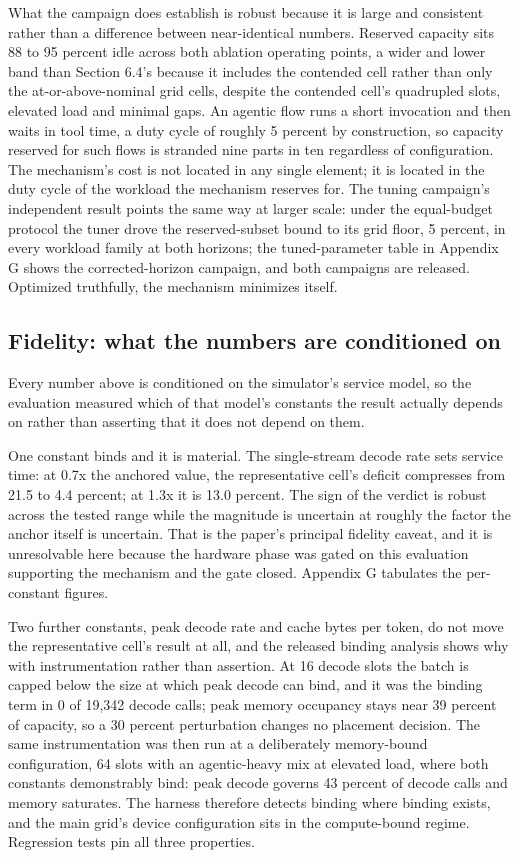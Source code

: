 What the campaign does establish is robust because it is large and
consistent rather than a difference between near-identical numbers.
Reserved capacity sits 88 to 95 percent idle across both ablation
operating points, a wider and lower band than Section 6.4's because it
includes the contended cell rather than only the at-or-above-nominal
grid cells, despite the contended cell's quadrupled slots, elevated load
and minimal gaps. An agentic flow runs a short invocation and then waits
in tool time, a duty cycle of roughly 5 percent by construction, so
capacity reserved for such flows is stranded nine parts in ten
regardless of configuration. The mechanism's cost is not located in any
single element; it is located in the duty cycle of the workload the
mechanism reserves for. The tuning campaign's independent result points
the same way at larger scale: under the equal-budget protocol the tuner
drove the reserved-subset bound to its grid floor, 5 percent, in every
workload family at both horizons; the tuned-parameter table in Appendix
G shows the corrected-horizon campaign, and both campaigns are released.
Optimized truthfully, the mechanism minimizes itself.

\subsection{Fidelity: what the numbers are conditioned on}

Every number above is conditioned on the simulator's service model, so
the evaluation measured which of that model's constants the result
actually depends on rather than asserting that it does not depend on
them.

One constant binds and it is material. The single-stream decode rate
sets service time: at 0.7x the anchored value, the representative cell's
deficit compresses from 21.5 to 4.4 percent; at 1.3x it is 13.0 percent.
The sign of the verdict is robust across the tested range while the
magnitude is uncertain at roughly the factor the anchor itself is
uncertain. That is the paper's principal fidelity caveat, and it is
unresolvable here because the hardware phase was gated on this
evaluation supporting the mechanism and the gate closed. Appendix G
tabulates the per-constant figures.

Two further constants, peak decode rate and cache bytes per token, do not
move the representative cell's result at all, and the released binding
analysis shows why with instrumentation rather than assertion. At 16
decode slots the batch is capped below the size at which peak decode can
bind, and it was the binding term in 0 of 19,342 decode calls; peak
memory occupancy stays near 39 percent of capacity, so a 30 percent
perturbation changes no placement decision. The same instrumentation was
then run at a deliberately memory-bound configuration, 64 slots with an
agentic-heavy mix at elevated load, where both constants demonstrably
bind: peak decode governs 43 percent of decode calls and memory
saturates. The harness therefore detects binding where binding exists,
and the main grid's device configuration sits in the compute-bound
regime. Regression tests pin all three properties.
